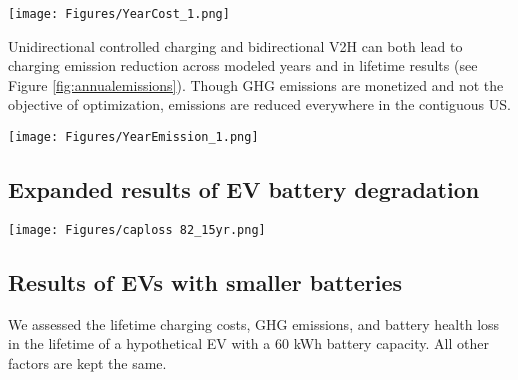 \documentclass[11pt,preprint]{elsarticle}
\begin{document}
\begin{figure*}
    \centering
    \texttt{[image: Figures/YearCost\_1.png]}
    \caption{Median annual charging costs for individual EVs, of each region across the US. Charging costs are defined as net increase in the electricity bill of the whole home after introducing EV charging. 2024, 2030 and 2040 are modeled annual results. The homes modeled have electrified space heating}
    \label{fig:annualcost}
\end{figure*}
\newpage

Unidirectional controlled charging and bidirectional V2H can both lead to charging emission reduction across modeled years and in lifetime results (see Figure \ref{fig:annualemissions}). Though GHG emissions are monetized and not the objective of optimization, emissions are reduced everywhere in the contiguous US.

\begin{figure*}
    \centering
    \texttt{[image: Figures/YearEmission\_1.png]}
    \caption{Median annual charging GHG emissions for individual EVs, of each region across the US. Charging GHG emissions are defined as net increase in GHG emissions of the whole home after introducing EV charging. 2024, 2030 and 2040 are modeled annual results. The homes modeled have electrified space heating}
    \label{fig:annualemissions}
\end{figure*}

\subsection{Expanded results of EV battery degradation}\label{sec:batdegsi}

\begin{figure*} 
    \centering 
    \texttt{[image: Figures/caploss 82\_15yr.png]} 
    \caption{Median capacity loss at the end of 15-year EV lifetime of counties across the US, across EV charging behavior cases and across battery models. The battery size of the EV is assumed to be 82kWh.} 
    \label{fig:caploss82} 
\end{figure*}

\subsection{Results of EVs with smaller batteries}

We assessed the lifetime charging costs, GHG emissions, and battery health loss in the lifetime of a hypothetical EV with a 60 kWh battery capacity. All other factors are kept the same. 
\end{document}
